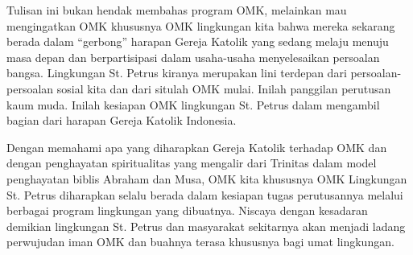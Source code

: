       Tulisan ini  bukan hendak membahas program OMK, melainkan mau mengingatkan OMK khususnya OMK lingkungan kita bahwa mereka sekarang berada dalam “gerbong” harapan Gereja Katolik yang sedang melaju menuju masa depan dan berpartisipasi dalam usaha-usaha menyelesaikan persoalan bangsa. Lingkungan St. Petrus kiranya  merupakan lini terdepan dari persoalan-persoalan sosial kita dan dari situlah OMK mulai. Inilah panggilan perutusan kaum muda. Inilah kesiapan OMK lingkungan St. Petrus dalam mengambil bagian dari harapan Gereja Katolik Indonesia.
 
      Dengan memahami apa yang diharapkan Gereja Katolik terhadap OMK dan  dengan penghayatan spiritualitas yang mengalir dari Trinitas dalam model penghayatan biblis Abraham dan Musa, OMK kita khususnya OMK Lingkungan St. Petrus diharapkan selalu berada dalam kesiapan tugas perutusannya melalui berbagai program lingkungan yang dibuatnya. Niscaya dengan kesadaran demikian lingkungan St. Petrus dan masyarakat sekitarnya akan menjadi ladang perwujudan iman OMK dan buahnya terasa khususnya bagi umat lingkungan.
 
